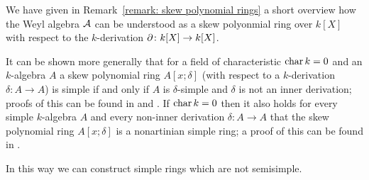 \begin{remark}
  We have given in Remark~\ref{remark: skew polynomial rings} a short overview how the Weyl algebra $\operatorname{\mathcal{A}}$ can be understood as a skew polyonmial ring over $k[X]$ with respect to the $k$-derivation $\partial \colon k[X] \to k[X]$.
  
  It can be shown more generally that for a field of characteristic $\operatorname{char} k = 0$ and an $k$-algebra $A$ a skew polynomial ring $A[x;\delta]$ (with respect to a $k$-derivation $\delta \colon A \to A$) is simple if and only if $A$ is $\delta$-simple and $\delta$ is not an inner derivation;
  proofs of this can be found in \cite[Theorem~3.15]{Lam1991First} and \cite[Proposition~2.1]{NoncommutativeNoetherian}.
  If $\operatorname{char} k = 0$ then it also holds for every simple $k$-algebra $A$ and every non-inner derivation $\delta \colon A \to A$ that the skew polynomial ring $A[x;\delta]$ is a nonartinian simple ring; a proof of this can be found in \cite[Corollary~3.16]{Lam1991First}.
  
  In this way we can construct simple rings which are not semisimple.
\end{remark}


